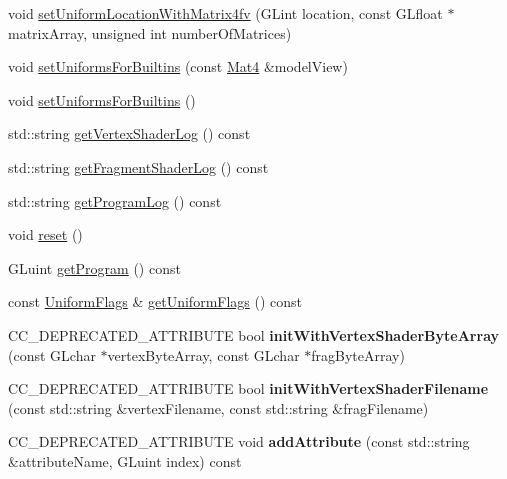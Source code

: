 \begin{DoxyCompactItemize}
\item 
void \hyperlink{classGLProgram_a3b6a91383721692fe73f316454325fd7}{set\+Uniform\+Location\+With\+Matrix4fv} (G\+Lint location, const G\+Lfloat $\ast$matrix\+Array, unsigned int number\+Of\+Matrices)
\item 
void \hyperlink{classGLProgram_a62b6c142c96d7286e5d465e0163947ba}{set\+Uniforms\+For\+Builtins} (const \hyperlink{classMat4}{Mat4} \&model\+View)
\item 
void \hyperlink{classGLProgram_af8f90606d2bffb6418a67195cb9ddc7d}{set\+Uniforms\+For\+Builtins} ()
\item 
std\+::string \hyperlink{classGLProgram_a82407faaa31b7bd933ba1bc870d62108}{get\+Vertex\+Shader\+Log} () const
\item 
std\+::string \hyperlink{classGLProgram_ac5715fdba2b5cde51888dba2faaa4ab8}{get\+Fragment\+Shader\+Log} () const
\item 
std\+::string \hyperlink{classGLProgram_a1397791d58a20f927a5e101b20646d22}{get\+Program\+Log} () const
\item 
void \hyperlink{classGLProgram_a457db5fbd837470d94157e4a0a525859}{reset} ()
\item 
G\+Luint \hyperlink{classGLProgram_a02a4cfcbcf881d3f6c83dac6861e6743}{get\+Program} () const
\item 
const \hyperlink{structGLProgram_1_1UniformFlags}{Uniform\+Flags} \& \hyperlink{classGLProgram_a809306485fbc3534053138ec531dbc97}{get\+Uniform\+Flags} () const
\item 
\mbox{\label{classGLProgram_ab05fdc80af71469c8ddc498fbffa9217}} 
C\+C\+\_\+\+D\+E\+P\+R\+E\+C\+A\+T\+E\+D\+\_\+\+A\+T\+T\+R\+I\+B\+U\+TE bool {\bfseries init\+With\+Vertex\+Shader\+Byte\+Array} (const G\+Lchar $\ast$vertex\+Byte\+Array, const G\+Lchar $\ast$frag\+Byte\+Array)
\item 
\mbox{\label{classGLProgram_ad60a2b677ad372d05537f8a0886d09e9}} 
C\+C\+\_\+\+D\+E\+P\+R\+E\+C\+A\+T\+E\+D\+\_\+\+A\+T\+T\+R\+I\+B\+U\+TE bool {\bfseries init\+With\+Vertex\+Shader\+Filename} (const std\+::string \&vertex\+Filename, const std\+::string \&frag\+Filename)
\item 
\mbox{\label{classGLProgram_a87ddcb95242ae7ca4a34f18025618400}} 
C\+C\+\_\+\+D\+E\+P\+R\+E\+C\+A\+T\+E\+D\+\_\+\+A\+T\+T\+R\+I\+B\+U\+TE void {\bfseries add\+Attribute} (const std\+::string \&attribute\+Name, G\+Luint index) const

\end{DoxyCompactItemize}
